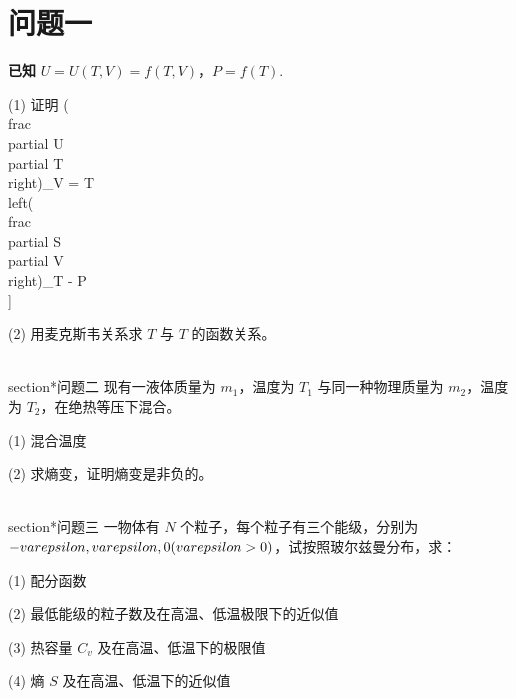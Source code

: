 \section*{问题一}
\textbf{已知} $U = U(T, V) = f(T, V)$，$P = f(T)$.

(1) 证明
\left( \\frac{\\partial U}{\\partial T} \\right)_V = T \\left( \\frac{\\partial S}{\\partial V} \\right)_T - P\\]

(2) 用麦克斯韦关系求 $T$ 与 $T$ 的函数关系。

\\section*{问题二}
现有一液体质量为 $m_1$，温度为 $T_1$ 与同一种物理质量为 $m_2$，温度为 $T_2$，在绝热等压下混合。

(1) 混合温度

(2) 求熵变，证明熵变是非负的。

\\section*{问题三}
一物体有 $N$ 个粒子，每个粒子有三个能级，分别为 $-\\varepsilon, \\varepsilon, 0 (\\varepsilon > 0)$，试按照玻尔兹曼分布，求：

(1) 配分函数

(2) 最低能级的粒子数及在高温、低温极限下的近似值

(3) 热容量 $C_v$ 及在高温、低温下的极限值

(4) 熵 $S$ 及在高温、低温下的近似值